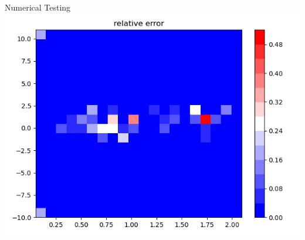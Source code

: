 \documentclass{beamer}
\newcommand{\s}{\sigma^2}
\newcommand{\y}{\overline{y}}
\begin{document}
   	\begin{frame}{Numerical Testing}
   		\includegraphics[scale=0.45]{relative_error.png}
   	\end{frame}

\end{document}
